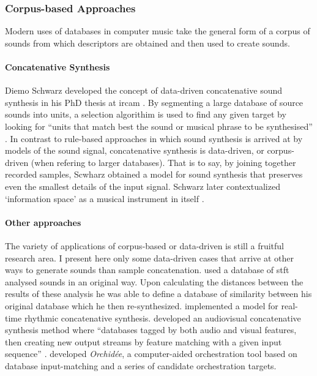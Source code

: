 \subsubsection{Corpus-based Approaches}
{
	Modern uses of databases in computer music take the general form of a corpus of sounds from which descriptors are obtained and then used to create sounds. 

	\paragraph{Concatenative Synthesis}
	Diemo Schwarz developed the concept of data-driven concatenative sound synthesis in his PhD thesis at \gls{ircam} \parencite{Schwarz2000, icmc/bbp2372.2003.099, Sch06:How}. By segmenting a large database of source sounds into units, a selection algorithim is used to find any given target by looking for ``units that match best the sound or musical phrase to be synthesised'' \parencite{Sch06:How}. In contrast to rule-based approaches in which sound synthesis is arrived at by models of the sound signal, concatenative synthesis is data-driven, or corpus-driven (when refering to larger databases). That is to say, by joining together recorded samples, Scwharz obtained a model for sound synthesis that preserves even the smallest details of the input signal. Schwarz later contextualized `information space' as a musical instrument in itself \parencites{diemo_schwarz_2009_849679}{Schwarz:2012}.

	\paragraph{Other approaches}
	The variety of applications of corpus-based or data-driven is still a fruitful research area. I present here only some data-driven cases that arrive at other ways to generate sounds than sample concatenation. \textcite{icmc/bbp2372.2003.052} used a database of \gls{stft} analysed sounds in an original way. Upon calculating the distances between the results of these analysis he was able to define a database of similarity between his original database which he then re-synthesized. \textcite{Nuannicode225in2016} implemented a model for real-time rhythmic concatenative synthesis. \textcite{DBLP:conf/icmc/Collins07} developed an audiovisual concatenative synthesis method where ``databases tagged by both audio and visual features, then creating new output streams by feature matching with a given input sequence'' \parencite[1]{DBLP:conf/icmc/Collins07}. \textcite{gregoire_carpentier_2006_849343} developed \textit{Orchidée}, a computer-aided orchestration tool based on database input-matching and a series of candidate orchestration targets.

}
